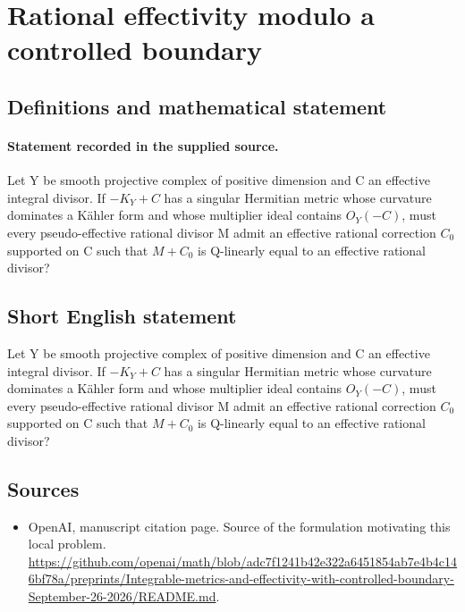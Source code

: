 \documentclass[11pt]{article}
\begin{document}
\section*{Rational effectivity modulo a controlled boundary}\label{30007046}
\subsection{Definitions and mathematical statement}
\paragraph{Statement recorded in the supplied source.}
Let Y be smooth projective complex of positive dimension and C an effective integral divisor. If $-K_Y+C$ has a singular Hermitian metric whose curvature dominates a Kähler form and whose multiplier ideal contains $O_Y(-C)$, must every pseudo-effective rational divisor M admit an effective rational correction $C_{0}$ supported on C such that $M+C_{0}$ is Q-linearly equal to an effective rational divisor?
\subsection{Short English statement}
Let Y be smooth projective complex of positive dimension and C an effective integral divisor. If $-K_Y+C$ has a singular Hermitian metric whose curvature dominates a Kähler form and whose multiplier ideal contains $O_Y(-C)$, must every pseudo-effective rational divisor M admit an effective rational correction $C_{0}$ supported on C such that $M+C_{0}$ is Q-linearly equal to an effective rational divisor?
\subsection{Sources}
\begin{itemize}
\item[S1] OpenAI, manuscript citation page. Source of the formulation motivating this local problem.
\url{https://github.com/openai/math/blob/adc7f1241b42e322a6451854ab7e4b4c146bf78a/preprints/Integrable-metrics-and-effectivity-with-controlled-boundary-September-26-2026/README.md}.
\end{itemize}
\end{document}

